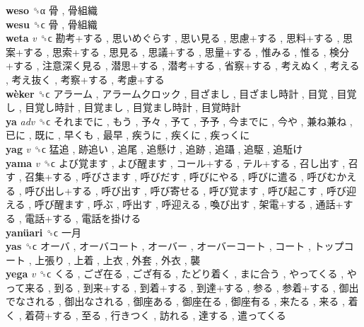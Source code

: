 \textbf{weso} ␝α   骨 ,  骨組織   \\
\textbf{wesu} ␝ϲ   骨 ,  骨組織   \\
\textbf{weta} \emph{v}  ␝ϲ   勘考+する ,  思いめぐらす ,  思い見る ,  思慮+する ,  思料+する ,  思案+する ,  思索+する ,  思見る ,  思議+する ,  思量+する ,  惟みる ,  惟る ,  検分+する ,  注意深く見る ,  潜思+する ,  潜考+する ,  省察+する ,  考えぬく ,  考える ,  考え抜く ,  考察+する ,  考慮+する   \\
\textbf{wèker} ␝ϲ   アラーム ,  アラームクロック ,  目ざまし ,  目ざまし時計 ,  目覚 ,  目覚し ,  目覚し時計 ,  目覚まし ,  目覚まし時計 ,  目覚時計   \\
\textbf{ya} \emph{adv}  ␝ϲ   それまでに ,  もう ,  予々 ,  予て ,  予予 ,  今までに ,  今や ,  兼ね兼ね ,  已に ,  既に ,  早くも ,  最早 ,  疾うに ,  疾くに ,  疾っくに   \\
\textbf{yag} \emph{v}  ␝ϲ   猛追 ,  跡追い ,  追尾 ,  追懸け ,  追跡 ,  追躡 ,  追駆 ,  追駈け   \\
\textbf{yama} \emph{v}  ␝ϲ   よび覚ます ,  よび醒ます ,  コール+する ,  テル+する ,  召し出す ,  召す ,  召集+する ,  呼びさます ,  呼びだす ,  呼びにやる ,  呼びに遣る ,  呼びむかえる ,  呼び出し+する ,  呼び出す ,  呼び寄せる ,  呼び覚ます ,  呼び起こす ,  呼び迎える ,  呼び醒ます ,  呼ぶ ,  呼出す ,  呼迎える ,  喚び出す ,  架電+する ,  通話+する ,  電話+する ,  電話を掛ける   \\
\textbf{yanüari} ␝ϲ   一月   \\
\textbf{yas} ␝ϲ   オーバ ,  オーバコート ,  オーバー ,  オーバーコート ,  コート ,  トップコート ,  上張り ,  上着 ,  上衣 ,  外套 ,  外衣 ,  襲   \\
\textbf{yega} \emph{v}  ␝ϲ   くる ,  ござ在る ,  ござ有る ,  たどり着く ,  まに合う ,  やってくる ,  やって来る ,  到る ,  到来+する ,  到着+する ,  到達+する ,  参る ,  参着+する ,  御出でなされる ,  御出なされる ,  御座ある ,  御座在る ,  御座有る ,  来たる ,  来る ,  着く ,  着荷+する ,  至る ,  行きつく ,  訪れる ,  達する ,  遣ってくる   \\
